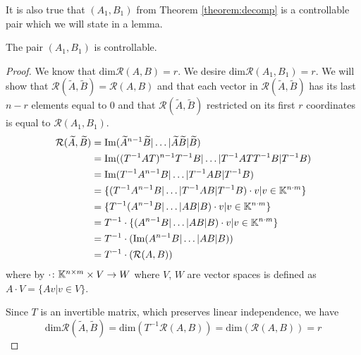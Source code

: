 It is also true that $(A_1,B_1)$ from Theorem \ref{theorem:decomp} is a controllable pair which we will state in a lemma.

\begin{lemma}
	The pair $(A_1,B_1)$ is controllable.
\end{lemma}

\begin{proof}
	We know that $\text{dim}\mathcal{R}(A,B)=r$. We desire $\text{dim}\mathcal{R}(A_1,B_1)=r$. We will show that $\mathcal{R}(\widetilde{A},\widetilde{B})=\mathcal{R}(A,B)$ and that each vector in $\mathcal{R}(\widetilde{A},\widetilde{B})$ has its last $n-r$ elements equal to 0 and that $\mathcal{R}(\widetilde{A},\widetilde{B})$ restricted on its first $r$ coordinates is equal to $\mathcal{R}(A_1,B_1)$. 
	\begin{align*}
		\mathcal{R}(\widetilde{A},\widetilde{B})&=\text{Im}(\widetilde{A}^{n-1}\widetilde{B}|\ldots|\widetilde{A}\widetilde{B}|\widetilde{B}) \\
		&=\text{Im}((T^{-1}AT)^{n-1}T^{-1}B|\ldots|T^{-1}ATT^{-1}B|T^{-1}B) \\
		&=\text{Im}(T^{-1}A^{n-1}B|\ldots|T^{-1}AB|T^{-1}B) \\
		&=\{(T^{-1}A^{n-1}B|\ldots|T^{-1}AB|T^{-1}B)\cdot v | v \in \mathbb{K}^{n\cdot m}\} \\
		&=\{T^{-1}(A^{n-1}B|\ldots|AB|B)\cdot v | v \in \mathbb{K}^{n\cdot m}\} \\
		&=T^{-1}\cdot\{(A^{n-1}B|\ldots|AB|B)\cdot v | v \in \mathbb{K}^{n\cdot m}\} \\
		&=T^{-1}\cdot(\text{Im}(A^{n-1}B|\ldots|AB|B)) \\
		&=T^{-1}\cdot(\mathcal{R}(A,B))
	\end{align*}
	where by $\cdot\colon\mathbb{K}^{n\times m}\times V\rightarrow W$ where $V$, $W$ are vector spaces is defined as $A\cdot V=\{Av|v\in V\}$.

	Since $T$ is an invertible matrix, which preserves linear independence, we have $$\text{dim}\mathcal{R}(\widetilde{A},\widetilde{B})=\text{dim}(T^{-1}\mathcal{R}(A,B))=\text{dim}(\mathcal{R}(A,B))=r$$


\end{proof}
